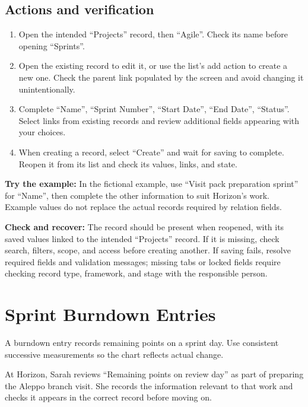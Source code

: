 \subsection{Actions and verification}
\begin{enumerate}
\item Open the intended “Projects” record, then “Agile”. Check its name before opening “Sprints”.
\item Open the existing record to edit it, or use the list's add action to create a new one. Check the parent link populated by the screen and avoid changing it unintentionally.
\item Complete “Name”, “Sprint Number”, “Start Date”, “End Date”, “Status”. Select links from existing records and review additional fields appearing with your choices.
\item When creating a record, select “Create” and wait for saving to complete. Reopen it from its list and check its values, links, and state.
\end{enumerate}

\textbf{Try the example:} In the fictional example, use “Visit pack preparation sprint” for “Name”, then complete the other information to suit Horizon's work. Example values do not replace the actual records required by relation fields.

\textbf{Check and recover:} The record should be present when reopened, with its saved values linked to the intended “Projects” record. If it is missing, check search, filters, scope, and access before creating another. If saving fails, resolve required fields and validation messages; missing tabs or locked fields require checking record type, framework, and stage with the responsible person.

\clearpage
\section{Sprint Burndown Entries}
\label{sec:projects-feature-sprint-burndown-entries}

A burndown entry records remaining points on a sprint day. Use consistent successive measurements so the chart reflects actual change.

\begin{rcnote}
At Horizon, Sarah reviews “Remaining points on review day” as part of preparing the Aleppo branch visit. She records the information relevant to that work and checks it appears in the correct record before moving on.
\end{rcnote}


